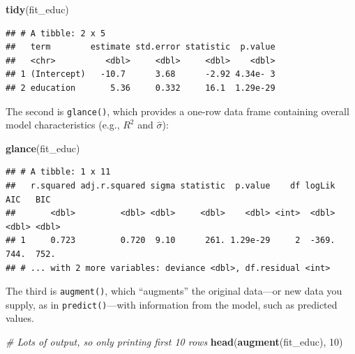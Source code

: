 \documentclass[12pt,oneside,openany]{book}
\newenvironment{Shaded}{\begin{snugshade}}{\end{snugshade}}
\newcommand{\KeywordTok}[1]{\textcolor[rgb]{0.13,0.29,0.53}{\textbf{#1}}}
\newcommand{\DecValTok}[1]{\textcolor[rgb]{0.00,0.00,0.81}{#1}}
\newcommand{\CommentTok}[1]{\textcolor[rgb]{0.56,0.35,0.01}{\textit{#1}}}
\newcommand{\NormalTok}[1]{#1}
\begin{document}
\begin{Shaded}
\begin{Highlighting}[]
\KeywordTok{tidy}\NormalTok{(fit_educ)}
\end{Highlighting}
\end{Shaded}

\begin{verbatim}
## # A tibble: 2 x 5
##   term        estimate std.error statistic  p.value
##   <chr>          <dbl>     <dbl>     <dbl>    <dbl>
## 1 (Intercept)   -10.7      3.68      -2.92 4.34e- 3
## 2 education       5.36     0.332     16.1  1.29e-29
\end{verbatim}

The second is \texttt{glance()}, which provides a one-row data frame
containing overall model characteristics (e.g., \(R^2\) and
\(\hat{\sigma}\)):

\begin{Shaded}
\begin{Highlighting}[]
\KeywordTok{glance}\NormalTok{(fit_educ)}
\end{Highlighting}
\end{Shaded}

\begin{verbatim}
## # A tibble: 1 x 11
##   r.squared adj.r.squared sigma statistic  p.value    df logLik   AIC   BIC
##       <dbl>         <dbl> <dbl>     <dbl>    <dbl> <int>  <dbl> <dbl> <dbl>
## 1     0.723         0.720  9.10      261. 1.29e-29     2  -369.  744.  752.
## # ... with 2 more variables: deviance <dbl>, df.residual <int>
\end{verbatim}

The third is \texttt{augment()}, which ``augments'' the original
data---or new data you supply, as in \texttt{predict()}---with
information from the model, such as predicted values.

\begin{Shaded}
\begin{Highlighting}[]
\CommentTok{# Lots of output, so only printing first 10 rows}
\KeywordTok{head}\NormalTok{(}\KeywordTok{augment}\NormalTok{(fit_educ), }\DecValTok{10}\NormalTok{)}
\end{Highlighting}
\end{Shaded}
\end{document}
